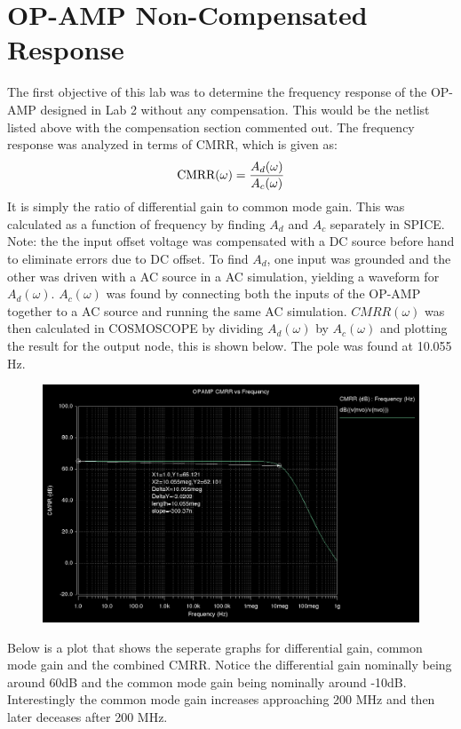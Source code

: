 \documentclass[12pt]{article}
\begin{document}
\section{OP-AMP Non-Compensated Response}
The first objective of this lab was to determine the frequency response of the OP-AMP designed in Lab 2 without any compensation. This would be the netlist listed above with the compensation section commented out. The frequency response was analyzed in terms of CMRR, which is given as:
\begin{equation}
\textnormal{CMRR}(\omega) = \frac{A_{d}(\omega)}{A_{c}(\omega)}
\end{equation}
It is simply the ratio of differential gain to common mode gain. This was calculated as a function of frequency by finding $A_d$ and $A_c$ separately in SPICE. Note: the the input offset voltage was compensated with a DC source before hand to eliminate errors due to DC offset. To find $A_d$, one input was grounded and the other was driven with a AC source in a AC simulation, yielding a waveform for $A_d(\omega)$. $A_c(\omega)$ was found by connecting both the inputs of the OP-AMP together to a AC source and running the same AC simulation. $CMRR(\omega)$ was then calculated in COSMOSCOPE by dividing $A_d(\omega)$ by $A_c(\omega)$ and plotting the result for the output node, this is shown below. The pole was found at 10.055 Hz.
\FloatBarrier
\begin{figure}[h!]
\begin{center}
 \includegraphics[scale=0.3]{./cmrr.png}
\end{center}
\end{figure}
\FloatBarrier
Below is a plot that shows the seperate graphs for differential gain, common mode gain and the combined CMRR. Notice the differential gain nominally being around 60dB and the common mode gain being nominally around -10dB. Interestingly the common mode gain increases approaching 200 MHz and then later deceases after 200 MHz.
\end{document}
